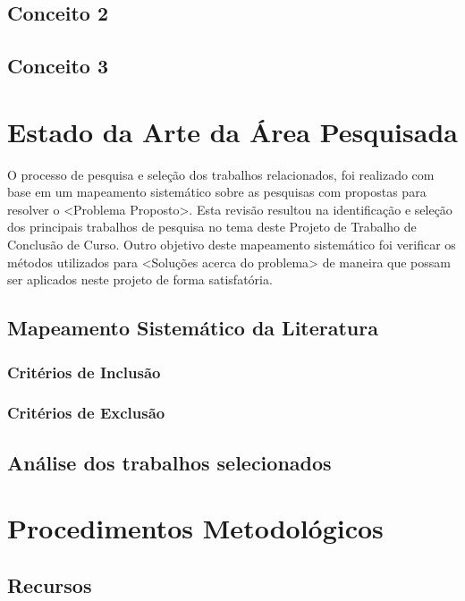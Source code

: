 \section{Conceito 2}
\label{sec:conceito2}

\section{Conceito 3}
\label{sec:conceito3}

\chapter{Estado da Arte da Área Pesquisada}
\label{chap:mapeamento}

O processo de pesquisa e seleção dos trabalhos relacionados, foi realizado com base em um mapeamento sistemático sobre as pesquisas com propostas para resolver o <Problema Proposto>. Esta revisão resultou na identificação e seleção dos principais trabalhos de pesquisa no tema deste Projeto de Trabalho de Conclusão de Curso. Outro objetivo deste mapeamento sistemático foi verificar os métodos utilizados para <Soluções acerca do problema> de maneira que possam ser aplicados neste projeto de forma satisfatória.

\section{Mapeamento Sistemático da Literatura}

\subsection{Critérios de Inclusão}

\subsection{Critérios de Exclusão}

\section{Análise dos trabalhos selecionados}

\chapter{Procedimentos Metodológicos}
\label{chap:metodologia}

\section{Recursos}


